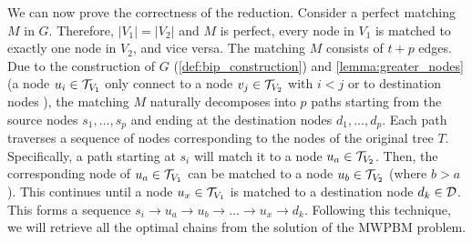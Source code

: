 We can now prove the correctness of the reduction. Consider a perfect matching $M$ in $G$. Therefore, $|V_1|=|V_2|$ and $M$ is perfect, every node in $V_1$ is matched to exactly one node in $V_2$, and vice versa. The matching $M$ consists of $t+p$ edges. Due to the construction of $G$ (\cref{def:bip_construction}) and \cref{lemma:greater_nodes} (a node $u_i \in \mathcal{T}_{V_1}$ only connect to a node $v_j \in \mathcal{T}_{V_2}$ with $i < j$ or to destination nodes \destset), the matching $M$ naturally decomposes into $p$ paths starting from the source nodes $s_1, \dots, s_p$ and ending at the destination nodes $d_1, \dots, d_p$. Each path traverses a sequence of nodes corresponding to the nodes of the original tree $T$.
Specifically, a path starting at $s_i$ will match it to a node $u_{a} \in \mathcal{T}_{V_2}$. Then, the corresponding node of $u_{a} \in \mathcal{T}_{V_1}$ can be matched to a node $u_{b} \in \mathcal{T}_{V_2}$ (where $b > a$). This continues until a node $u_{x} \in \mathcal{T}_{V_1}$ is matched to a destination node $d_k \in \mathcal{D}$. This forms a sequence $s_i \rightarrow u_{a} \rightarrow u_{b} \rightarrow \dots \rightarrow u_{x} \rightarrow d_k$. Following this technique, we will retrieve all the optimal chains from the solution of the \textsc{MWPBM} problem.

